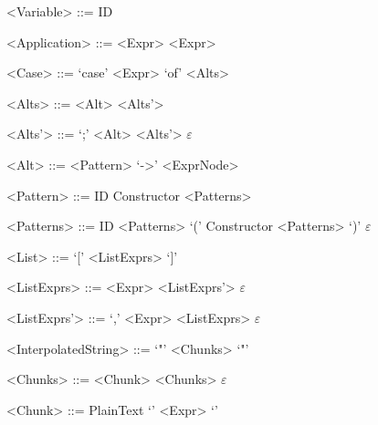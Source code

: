 \documentclass{report}
\begin{document}
\begin{grammar}
<Variable> ::= ID

<Application> ::= <Expr> <Expr>

<Case> ::= `case' <Expr> `of' <Alts>

<Alts> ::= <Alt> <Alts'>

<Alts'> ::= `;' <Alt> <Alts'>
\alt $\varepsilon$

<Alt> ::= <Pattern> `->' <ExprNode>

<Pattern> ::= ID
\alt Constructor <Patterns>

<Patterns> ::= ID <Patterns>
\alt `(' Constructor <Patterns> `)'
\alt $\varepsilon$

<List> ::= `[' <ListExprs> `]'

<ListExprs> ::= <Expr> <ListExprs'>
\alt $\varepsilon$

<ListExprs'> ::= `,' <Expr> <ListExprs>
\alt $\varepsilon$

<InterpolatedString> ::= `"' <Chunks> `"'

<Chunks> ::= <Chunk> <Chunks>
\alt $\varepsilon$

<Chunk> ::= PlainText
\alt `{' <Expr> `}'


\end{grammar}
\end{document}
